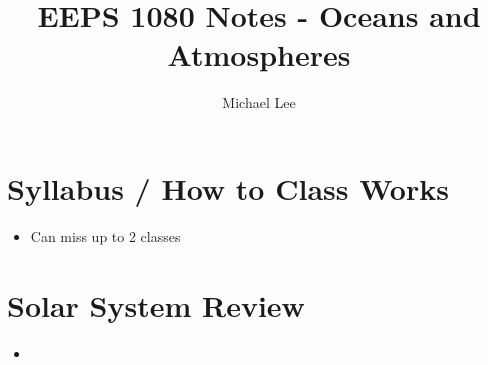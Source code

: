 \documentclass[11pt]{article}
\title{EEPS 1080 Notes - Oceans and Atmospheres}
\author{Michael Lee}
\begin{document}
\maketitle

\tableofcontents

\newpage

\section{Syllabus / How to Class Works}
\begin{itemize}
    \item Can miss up to 2 classes
\end{itemize}

\section{Solar System Review}
\begin{itemize}
    \item 
\end{itemize}
\end{document}
